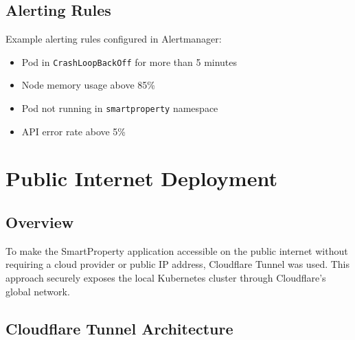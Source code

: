 \documentclass[12pt,a4paper]{report}
\begin{document}
\section{Alerting Rules}

Example alerting rules configured in Alertmanager:

\begin{itemize}
  \item Pod in \texttt{CrashLoopBackOff} for more than 5 minutes
  \item Node memory usage above 85\%
  \item Pod not running in \texttt{smartproperty} namespace
  \item API error rate above 5\%
\end{itemize}

\chapter{Public Internet Deployment}

\section{Overview}

To make the SmartProperty application accessible on the public internet without requiring a cloud provider or public IP address, Cloudflare Tunnel was used. This approach securely exposes the local Kubernetes cluster through Cloudflare's global network.

\section{Cloudflare Tunnel Architecture}
\end{document}
